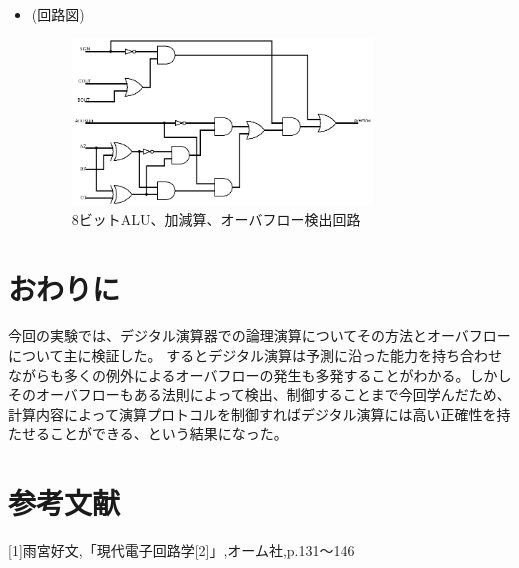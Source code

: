 \documentclass[11pt,a4j]{jsarticle}
\begin{document}
\begin{itemize}
    \item (回路図)
    
    \begin{figure}[htbp]
  \centering
  \includegraphics[width=8cm,clip]{3-e.png}
  \caption{8ビットALU、加減算、オーバフロー検出回路}
  \label{fig:3-e}
 \end{figure}
    
    
    \end{itemize}
    
    
   
   
  
  
 \section{おわりに}
  
  今回の実験では、デジタル演算器での論理演算についてその方法とオーバフローについて主に検証した。
  するとデジタル演算は予測に沿った能力を持ち合わせながらも多くの例外によるオーバフローの発生も多発することがわかる。しかしそのオーバフローもある法則によって検出、制御することまで今回学んだため、計算内容によって演算プロトコルを制御すればデジタル演算には高い正確性を持たせることができる、という結果になった。
  
  
 \section{参考文献}
  [1]雨宮好文,「現代電子回路学[2]」,オーム社,p.131～146
  
  
\end{document}
